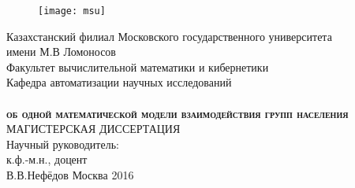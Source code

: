\begin{titlepage}
\begin{figure}[h!]
    \centering
    \texttt{[image: msu]}
\end{figure}
\begin{center}
Казахстанский филиал Московского государственного университета \\ 
имени М.В Ломоносов\\
Факультет вычислительной математики и кибернетики\\
Кафедра автоматизации научных исследований\\
\vspace{2cm}
\vspace{1cm}\\
\textsc{\textbf{об одной математической модели взаимодействия групп населения}}
\vspace{1cm}\\
МАГИСТЕРСКАЯ ДИССЕРТАЦИЯ
\vspace{1cm}\\
\hfill Научный руководитель: \\
\hfill к.ф.-м.н., доцент\\
\hfill В.В.Нефёдов
\vfill Москва 2016
\end{center}
\end{titlepage}